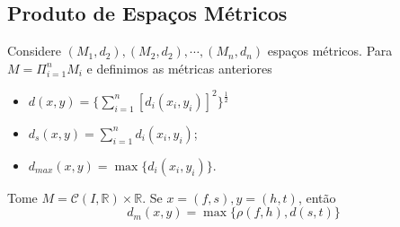 \documentclass[MetricSpaces/metric_notes.tex]{subfiles}
\begin{document}
\subsection{Produto de Espaços Métricos}
Considere \((M_{1}, d_{2}), (M_{2}, d_{2}), \cdots, (M_{n}, d_{n})\) espaços métricos. Para \(M=\Pi_{i=1}^{n}M_{i}\) e definimos as métricas anteriores
\begin{itemize}
	\item \(d(x, y) = \biggl\{\sum\limits_{i=1}^{n}[d_{i}(x_{i}, y_{i})]^{2}\biggr\}^{\frac{1}{2}}\)
	\item \(d_{s}(x, y) = \sum\limits_{i=1}^{n}d_{i}(x_{i}, y_{i})\);
	\item \(d_{max}(x, y) = \max\{d_{i}(x_{i}, y_{i})\}\).
\end{itemize}
\begin{example}
	Tome \(M = \mathcal{C}(I, \mathbb{R})\times \mathbb{R}\). Se \(x = (f, s), y=(h, t)\), então
	\[
		d_{m}(x, y) = \max \biggl\{\rho (f, h), d(s, t)\biggr\}
	\]
\end{example}
\end{document}
